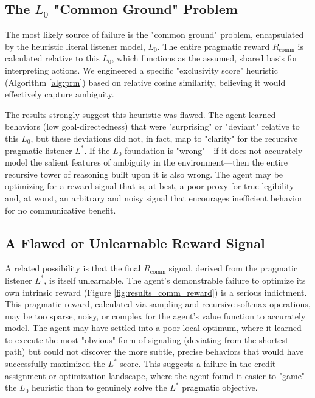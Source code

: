 \documentclass[12pt, a4paper]{report}
\newcommand{\Rcomm}{R_{\text{comm}}}
\begin{document}
\subsection{The $L_0$ "Common Ground" Problem}
The most likely source of failure is the "common ground" problem, encapsulated by the heuristic literal listener model, $L_0$. The entire pragmatic reward $\Rcomm$ is calculated relative to this $L_0$, which functions as the assumed, shared basis for interpreting actions. We engineered a specific "exclusivity score" heuristic (Algorithm \ref{alg:prm}) based on relative cosine similarity, believing it would effectively capture ambiguity.

The results strongly suggest this heuristic was flawed. The agent learned behaviors (low goal-directedness) that were "surprising" or "deviant" relative to this $L_0$, but these deviations did not, in fact, map to "clarity" for the recursive pragmatic listener $L^*$. If the $L_0$ foundation is "wrong"---if it does not accurately model the salient features of ambiguity in the environment---then the entire recursive tower of reasoning built upon it is also wrong. The agent may be optimizing for a reward signal that is, at best, a poor proxy for true legibility and, at worst, an arbitrary and noisy signal that encourages inefficient behavior for no communicative benefit.

\subsection{A Flawed or Unlearnable Reward Signal}
A related possibility is that the final $\Rcomm$ signal, derived from the pragmatic listener $L^*$, is itself unlearnable. The agent's demonstrable failure to optimize its own intrinsic reward (Figure \ref{fig:results_comm_reward}) is a serious indictment. This pragmatic reward, calculated via sampling and recursive softmax operations, may be too sparse, noisy, or complex for the agent's value function to accurately model. The agent may have settled into a poor local optimum, where it learned to execute the most "obvious" form of signaling (deviating from the shortest path) but could not discover the more subtle, precise behaviors that would have successfully maximized the $L^*$ score. This suggests a failure in the credit assignment or optimization landscape, where the agent found it easier to "game" the $L_0$ heuristic than to genuinely solve the $L^*$ pragmatic objective.
\end{document}

